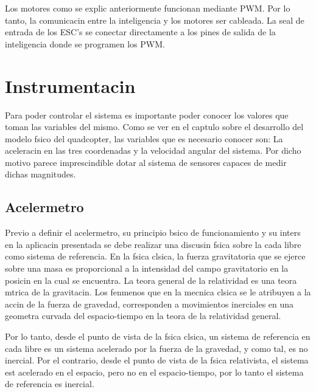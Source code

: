 \documentclass[spanish,12pt,a4paper,titlepage]{report}
\begin{document}
Los motores como se explic anteriormente funcionan mediante PWM. Por lo tanto, la comunicacin entre la inteligencia y los motores ser cableada. La seal de entrada de los ESC's se conectar directamente a los pines de salida de la inteligencia donde se programen los PWM. 

\newpage
\section{Instrumentacin}
\vspace*{15pt}
Para poder controlar el sistema es importante poder conocer los valores que toman las variables del mismo. Como se ver en el captulo sobre el desarrollo del modelo fsico del quadcopter, las variables que es necesario conocer son: La aceleracin en las tres coordenadas y la velocidad angular del sistema. Por dicho motivo parece imprescindible dotar al sistema de sensores capaces de medir dichas magnitudes.

\subsection{Acelermetro}
\label{acelerometro}
\vspace*{15pt}

Previo a definir el acelermetro, su principio bsico de funcionamiento y su inters en la aplicacin presentada se debe realizar una discusin fsica sobre la cada libre como sistema de referencia.
En la fsica clsica, la fuerza gravitatoria que se ejerce sobre una masa es proporcional a la intensidad del campo gravitatorio en la posicin en la cual se encuentra. 
La teora general de la relatividad es una teora mtrica de la gravitacin. Los fenmenos que en la mecnica clsica se le atribuyen a la accin de la fuerza de gravedad, corresponden a movimientos inerciales en una geometra curvada del espacio-tiempo en la teora de la relatividad general.

Por lo tanto, desde el punto de vista de la fsica clsica, un sistema de referencia en cada libre es un sistema acelerado por la fuerza de la gravedad, y como tal, es no inercial.
Por el contrario, desde el punto de vista de la fsica relativista, el sistema est acelerado en el espacio, pero no en el espacio-tiempo, por lo tanto el sistema de referencia es inercial.
\end{document}
